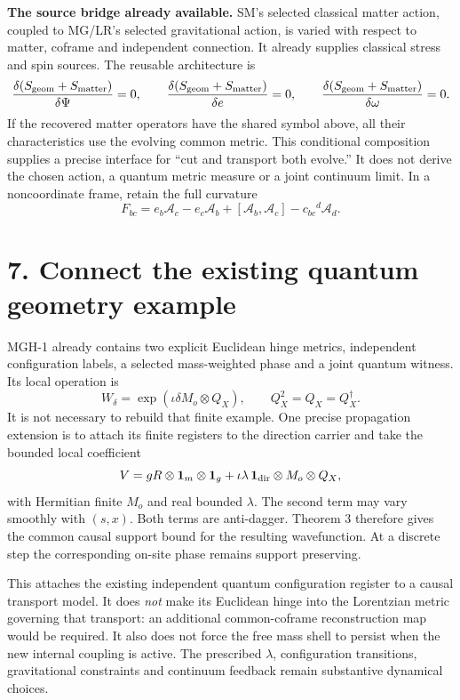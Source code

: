\documentclass[11pt,a4paper]{article}
\newcommand{\ii}{\iota}\newcommand{\id}{\mathbf1}\newcommand{\dd}{\mathrm d}\newcommand{\tr}{\operatorname{Tr}}
\begin{document}
\textbf{The source bridge already available.} SM's selected classical matter action, coupled to MG/LR's selected gravitational action, is varied with respect to matter, coframe and independent connection. It already supplies classical stress and spin sources. The reusable architecture is
\[
\frac{\delta(S_{\rm geom}+S_{\rm matter})}{\delta\Psi}=0,\qquad
\frac{\delta(S_{\rm geom}+S_{\rm matter})}{\delta e}=0,\qquad
\frac{\delta(S_{\rm geom}+S_{\rm matter})}{\delta\omega}=0.
\]
If the recovered matter operators have the shared symbol above, all their characteristics use the evolving common metric. This conditional composition supplies a precise interface for ``cut and transport both evolve.'' It does not derive the chosen action, a quantum metric measure or a joint continuum limit. In a noncoordinate frame, retain the full curvature
\[
F_{bc}=e_b\mathcal A_c-e_c\mathcal A_b+[\mathcal A_b,\mathcal A_c]-c_{bc}{}^d\mathcal A_d.
\]

\newpage
\section*{7. Connect the existing quantum geometry example}
MGH-1 already contains two explicit Euclidean hinge metrics, independent configuration labels, a selected mass-weighted phase and a joint quantum witness. Its local operation is
\[
W_\delta=\exp(\ii\delta M_o\otimes Q_X),\qquad Q_X^2=Q_X=Q_X^\dagger.
\]
It is not necessary to rebuild that finite example. One precise propagation extension is to attach its finite registers to the direction carrier and take the bounded local coefficient
\[
V=gR\otimes\id_m\otimes\id_g
+\ii\lambda\,\id_{\rm dir}\otimes M_o\otimes Q_X,
\]
with Hermitian finite $M_o$ and real bounded $\lambda$. The second term may vary smoothly with $(s,x)$. Both terms are anti-dagger. Theorem 3 therefore gives the common causal support bound for the resulting wavefunction. At a discrete step the corresponding on-site phase remains support preserving.

This attaches the existing independent quantum configuration register to a causal transport model. It does \emph{not} make its Euclidean hinge into the Lorentzian metric governing that transport: an additional common-coframe reconstruction map would be required. It also does not force the free mass shell to persist when the new internal coupling is active. The prescribed $\lambda$, configuration transitions, gravitational constraints and continuum feedback remain substantive dynamical choices.
\end{document}
